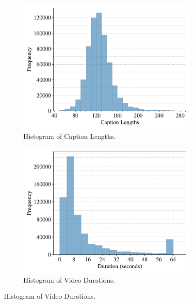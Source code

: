 \begin{figure}[!ht]
    \centering
    \begin{subfigure}[c]{0.3\textwidth}
        \centering
        \includegraphics[width=\linewidth]{images/Caption_Lengths.pdf}
        \caption{Histogram of Caption Lengths.}
        \label{sup.f.hist1}
    \end{subfigure}%
    \hfill
    \begin{subfigure}[c]{0.3\textwidth}
        \centering
        \includegraphics[width=\linewidth]{images/Duration.pdf}
        \caption{Histogram of Video Durations.}
        \label{sup.f.hist2}  
    \end{subfigure}%
    \hfill

\end{figure}
